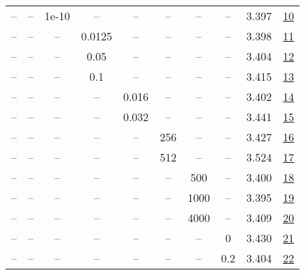 \begin{table}[H]
\begin{tabular}{cccccccccc}
-- & -- & 1e-10 & -- & -- & -- & -- & -- & 3.397 & \href{https://wandb.ai/stanford-mercury/optimizer-scaling/runs/sweep-130m-5B-mars857a95lr0.008-wd0.1-minlr0-warmup2000-b10.95-b-338f34}{10} \\
-- & -- & -- & 0.0125 & -- & -- & -- & -- & 3.398 & \href{https://wandb.ai/stanford-mercury/optimizer-scaling/runs/sweep-130m-5B-marsf03129lr0.008-wd0.1-minlr0-warmup2000-b10.95-b-8ea8ad}{11} \\
-- & -- & -- & 0.05 & -- & -- & -- & -- & 3.404 & \href{https://wandb.ai/stanford-mercury/optimizer-scaling/runs/sweep-130m-5B-marspd43f88lr0.008-wd0.1-minlr0-warmup2000-b10.95--050b21}{12} \\
-- & -- & -- & 0.1 & -- & -- & -- & -- & 3.415 & \href{https://wandb.ai/stanford-mercury/optimizer-scaling/runs/sweep-130m-5B-marsd28047lr0.008-wd0.1-minlr0-warmup2000-b10.95-b-0571c3}{13} \\
-- & -- & -- & -- & 0.016 & -- & -- & -- & 3.402 & \href{https://wandb.ai/stanford-mercury/optimizer-scaling/runs/sweep-130m-5B-mars0c1462lr0.016-wd0.1-minlr0-warmup2000-b10.95-b-d9744e}{14} \\
-- & -- & -- & -- & 0.032 & -- & -- & -- & 3.441 & \href{https://wandb.ai/stanford-mercury/optimizer-scaling/runs/sweep-130m-5B-mars67d195lr0.032-wd0.1-minlr0-warmup2000-b10.95-b-b5b9ca}{15} \\
-- & -- & -- & -- & -- & 256 & -- & -- & 3.427 & \href{https://wandb.ai/stanford-mercury/optimizer-scaling/runs/sweep-130m-5B-marsfc8923lr0.008-wd0.1-minlr0-warmup2000-b10.95-b-1bbff7}{16} \\
-- & -- & -- & -- & -- & 512 & -- & -- & 3.524 & \href{https://wandb.ai/stanford-mercury/optimizer-scaling/runs/sweep-130m-5B-marsp4f0718lr0.008-wd0.1-minlr0-warmup2000-b10.95--094fbe}{17} \\
-- & -- & -- & -- & -- & -- & 500 & -- & 3.400 & \href{https://wandb.ai/stanford-mercury/optimizer-scaling/runs/sweep-130m-5B-marsp30b7b9lr0.008-wd0.1-minlr0-warmup500-b10.95-b-547d93}{18} \\
-- & -- & -- & -- & -- & -- & 1000 & -- & 3.395 & \href{https://wandb.ai/stanford-mercury/optimizer-scaling/runs/sweep-130m-5B-mars176a59lr0.008-wd0.1-minlr0-warmup1000-b10.95-b-ab41f8}{19} \\
-- & -- & -- & -- & -- & -- & 4000 & -- & 3.409 & \href{https://wandb.ai/stanford-mercury/optimizer-scaling/runs/sweep-130m-5B-marspa6f8dflr0.008-wd0.1-minlr0-warmup4000-b10.95--2e019b}{20} \\
-- & -- & -- & -- & -- & -- & -- & 0 & 3.430 & \href{https://wandb.ai/stanford-mercury/optimizer-scaling/runs/sweep-130m-5B-marsp6bc34clr0.008-wd0-minlr0-warmup2000-b10.95-b2-1650e9}{21} \\
-- & -- & -- & -- & -- & -- & -- & 0.2 & 3.404 & \href{https://wandb.ai/stanford-mercury/optimizer-scaling/runs/sweep-130m-5B-mars3cc0bclr0.008-wd0.2-minlr0-warmup2000-b10.95-b-bfae2c}{22} \\
\bottomrule
\end{tabular}
\end{table}

